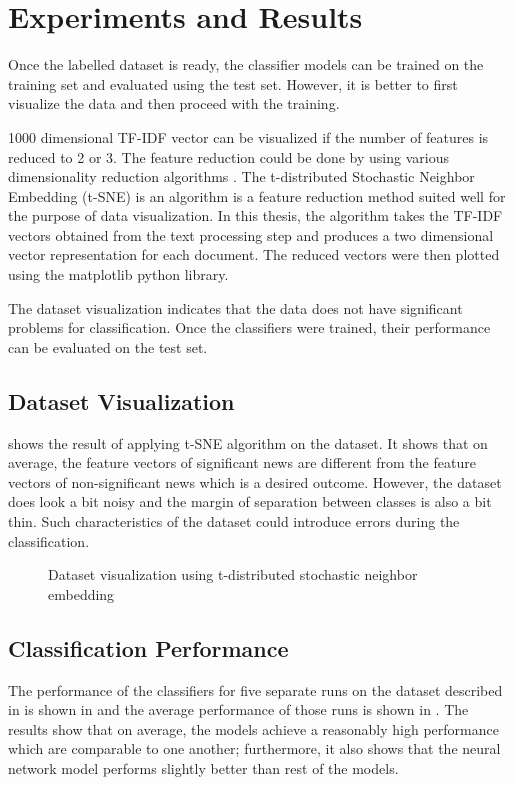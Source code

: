 \chapter{Experiments and Results} \label{result}
Once the labelled dataset is ready, the classifier models can be trained on the training set and evaluated using the test set. However, it is better to first visualize the data and then proceed with the training.

1000 dimensional TF-IDF vector can be visualized if the number of features is reduced to 2 or 3. The feature reduction could be done by using various dimensionality reduction algorithms \cite{tenenbaum2000global, roweis2000nonlinear}. The t-distributed Stochastic Neighbor Embedding (t-SNE)\cite{maaten2008visualizing} is an algorithm  is a feature reduction method suited well for the purpose of data visualization. In this thesis, the algorithm takes the TF-IDF vectors obtained from the text processing step and produces a two dimensional vector representation for each document. The reduced vectors were then plotted using the matplotlib\cite{hunter2007matplotlib} python library.

The dataset visualization indicates that the data does not have significant problems for classification.  Once the classifiers were trained, their performance can be evaluated on the test set.

\section{Dataset Visualization}
 shows the result of applying t-SNE algorithm on the dataset. It shows that on average, the feature vectors of significant news are different from the feature vectors of non-significant news which is a desired outcome. However, the dataset does look a bit noisy and the margin of separation between classes is also a bit thin. Such characteristics of the dataset could introduce errors during the classification.

\begin{figure}[h]
    \caption{Dataset visualization using t-distributed stochastic neighbor embedding}
    \label{fig:dataset}
\end{figure}

\section{Classification Performance}
The performance of the classifiers for five separate runs on the dataset described in    is shown in  and the average performance of those runs is shown in . The results show that on average, the models achieve a reasonably high performance which are comparable to one another; furthermore, it also shows that the neural network model performs slightly better than rest of the models.

